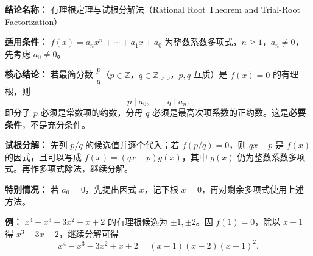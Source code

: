 \textbf{结论名称：} 有理根定理与试根分解法（Rational Root Theorem and Trial-Root Factorization）

\textbf{适用条件：} $f(x)=a_nx^n+\cdots+a_1x+a_0$ 为整数系数多项式，$n\ge 1$，$a_n\ne 0$，先考虑 $a_0\ne 0$。

\textbf{核心结论：} 若最简分数 $\dfrac pq$（$p\in\mathbb Z$，$q\in\mathbb Z_{>0}$，$p,q$ 互质）是 $f(x)=0$ 的有理根，则
\[
\boxed{p\mid a_0,\qquad q\mid a_n.}
\]
即分子 $p$ 必须是常数项的约数，分母 $q$ 必须是最高次项系数的正约数。这是\textbf{必要条件}，不是充分条件。

\textbf{试根分解：} 先列 $p/q$ 的候选值并逐个代入；若 $f(p/q)=0$，则 $qx-p$ 是 $f(x)$ 的因式，且可以写成 $f(x)=(qx-p)g(x)$，其中 $g(x)$ 仍为整数系数多项式。再作多项式除法，继续分解。

\textbf{特别情况：} 若 $a_0=0$，先提出因式 $x$，记下根 $x=0$，再对剩余多项式使用上述方法。

\textbf{例：} $x^4-x^3-3x^2+x+2$ 的有理根候选为 $\pm1,\pm2$。因 $f(1)=0$，除以 $x-1$ 得 $x^3-3x-2$，继续分解可得
\[
\boxed{x^4-x^3-3x^2+x+2=(x-1)(x-2)(x+1)^2.}
\]
